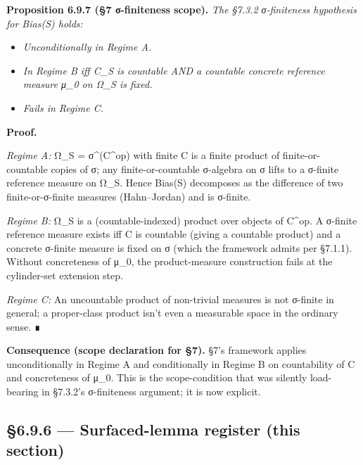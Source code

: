 \documentclass[11pt, openany]{book}
\begin{document}
\textbf{Proposition 6.9.7 (§7 σ-finiteness scope).} \textit{The §7.3.2 σ-finiteness hypothesis for Bias(S) holds:}

\begin{itemize}
\item \textit{Unconditionally in Regime A.}
\item \textit{In Regime B iff C\_\allowbreak{}S is countable AND a countable concrete reference measure μ\_\allowbreak{}0 on Ω\_\allowbreak{}S is fixed.}
\item \textit{Fails in Regime C.}
\end{itemize}

\textbf{Proof.}

\textit{Regime A:} Ω\_\allowbreak{}S = σ\textasciicircum{}(C\textasciicircum{}op) with finite C is a finite product of finite-or-countable copies of σ; any finite-or-countable σ-algebra on σ lifts to a σ-finite reference measure on Ω\_\allowbreak{}S. Hence Bias(S) decomposes as the difference of two finite-or-σ-finite measures (Hahn–Jordan) and is σ-finite.

\textit{Regime B:} Ω\_\allowbreak{}S is a (countable-indexed) product over objects of C\textasciicircum{}op. A σ-finite reference measure exists iff C is countable (giving a countable product) and a concrete σ-finite measure is fixed on σ (which the framework admits per §7.1.1). Without concreteness of μ\_\allowbreak{}0, the product-measure construction fails at the cylinder-set extension step.

\textit{Regime C:} An uncountable product of non-trivial measures is not σ-finite in general; a proper-class product isn't even a measurable space in the ordinary sense. ∎

\textbf{Consequence (scope declaration for §7).} §7's framework applies unconditionally in Regime A and conditionally in Regime B on countability of C and concreteness of μ\_\allowbreak{}0. This is the scope-condition that was silently load-bearing in §7.3.2's σ-finiteness argument; it is now explicit.

\subsection{§6.9.6 --- Surfaced-lemma register (this section)}
\end{document}
